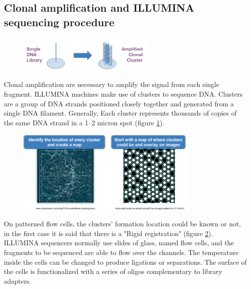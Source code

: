 
\subsection{Clonal amplification and ILLUMINA sequencing procedure}

\begin{figure}[h]
\caption{}
\centering
\includegraphics[width=0.6\textwidth]{clusterAmplification}
\label{clusters}
\end{figure}

Clonal amplification are necessary to amplify the signal from each single fragment.
ILLUMINA machines make use of clusters to sequence DNA. Clusters are a group of DNA
strands positioned closely together and generated from a single DNA filament. Generally, Each cluster represents thousands of copies of the same DNA strand in a 1–2 micron spot (figure \ref{clusters}). 

\begin{figure}[h]
\caption{}
\centering
\includegraphics[width=0.8\textwidth]{rigidGeneration}
\label{rigid}
\end{figure}

On patterned flow cells, the clusters' formation location could be known or not, in the first case it is said that there is a "Rigid registration" (figure \ref{rigid}).\\


ILLUMINA sequencers normally use slides of glass, named flow cells, and the fragments to be sequenced are able to flow over the channels. The temperature inside the cells can be changed to produce ligations or separations. The surface of the cells is functionalized with a series of oligos complementary to library adapters.

